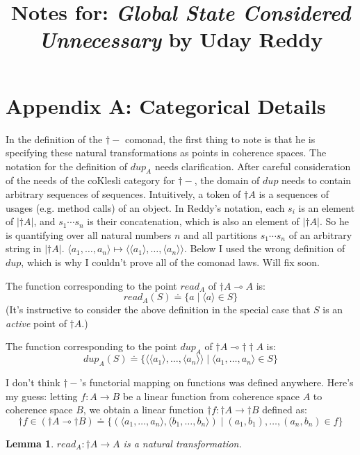 \documentclass{article}
\title{Notes for: \emph{Global State Considered Unnecessary} by Uday Reddy}
\newtheorem{lemma}{Lemma}
\begin{document}
\maketitle


\section*{Appendix A: Categorical Details}

In the definition of the $\dagger-$ comonad, the first thing to note is that he is specifying these natural transformations as points in coherence spaces. The notation for the definition of $\mathit{dup}_A$ needs clarification. After careful consideration of the needs of the coKlesli category for $\dagger -$, the domain of $\mathit{dup}$ needs to contain arbitrary sequences of sequences. Intuitively, a token of $\dagger A$ is a sequences of usages (e.g. method calls) of an object. In Reddy's notation, each $s_i$ is an element of $| \dagger A |$, and $s_1 \cdots s_n$ is their concatenation, which is also an element of $| \dagger A|$. So he is quantifying over all natural numbers $n$ and all partitions $s_1 \cdots s_n$ of an arbitrary string in $| \dagger A|$.  $\langle a_1, \ldots, a_n \rangle \mapsto \langle \langle a_1 \rangle, \ldots, \langle a_n \rangle \rangle$. Below I used the wrong definition of $\mathit{dup}$, which is why I couldn't prove all of the comonad laws. Will fix soon.

The function corresponding to the point $\mathit{read}_A$ of 
$\dagger A \multimap A$ is:
$$\mathit{read_A}(S) \doteq \{ a \mid \langle a \rangle \in S \}$$
(It's instructive to consider the above definition in the special case that $S$ is an \emph{active} point of $\dagger A$.)

The function corresponding to the point $\mathit{dup}_A$ of $\dagger A \multimap \dagger \dagger A$ is:
$$\mathit{dup}_A(S) \doteq \{ \langle \langle a_1 \rangle, \ldots, \langle a_n \rangle \rangle \mid \langle a_1, \ldots, a_n \rangle \in S \} $$

I don't think $\dagger -$'s functorial mapping on functions was defined anywhere. Here's my guess: letting $f : A \to B$ be a linear function from coherence space $A$ to coherence space $B$, we obtain a linear function $\dagger f : \dagger A \to \dagger B$ defined as:
$$\dagger f \in (\dagger A \multimap \dagger B) \doteq \{ ( \langle a_1,\ldots,a_n \rangle, \langle b_1, \ldots, b_n \rangle)  \mid (a_1,b_1),\ldots,(a_n,b_n) \in f \}$$
 
\begin{lemma}
$\mathit{read_A} : \dagger A \to A$ is a natural transformation.
\end{lemma}
\end{document}
